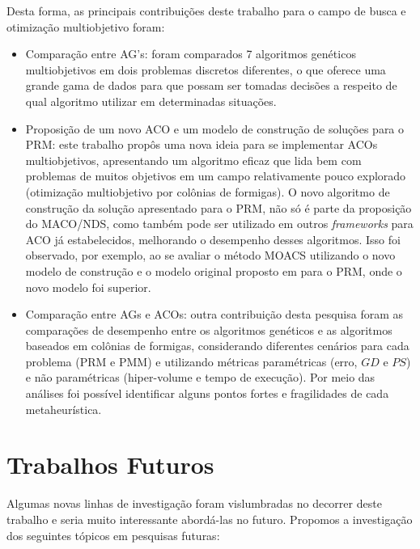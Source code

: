 Desta forma, as principais contribuições deste trabalho para o campo de busca e otimização multiobjetivo foram:

\begin{itemize}
	\item Comparação entre AG's: foram comparados 7 algoritmos genéticos multiobjetivos em dois problemas discretos diferentes, o que oferece uma grande gama de dados para que possam ser tomadas decisões a respeito de qual algoritmo utilizar em determinadas situações.
	\item Proposição de um novo ACO e um modelo de construção de soluções para o PRM: este trabalho propôs uma nova ideia para se implementar ACOs multiobjetivos, apresentando um algoritmo eficaz que lida bem com problemas de muitos objetivos em um campo relativamente pouco explorado (otimização multiobjetivo por colônias de formigas). O novo algoritmo de construção da solução apresentado para o PRM, não só é parte da proposição do MACO/NDS, como também pode ser utilizado em outros \textit{frameworks} para ACO já estabelecidos, melhorando o desempenho desses algoritmos. Isso foi observado, por exemplo, ao se avaliar o método MOACS utilizando o novo modelo de construção e o modelo original proposto em \cite{Riveros2016} para o PRM, onde o novo modelo foi superior.
	\item Comparação entre AGs e ACOs: outra contribuição desta pesquisa foram as comparações de desempenho entre os algoritmos genéticos e as algoritmos baseados em colônias de formigas, considerando diferentes cenários para cada problema (PRM e PMM) e utilizando  métricas paramétricas (erro, $GD$ e $PS$) e não paramétricas (hiper-volume e tempo de execução). Por meio das análises foi possível identificar alguns pontos fortes e fragilidades de cada metaheurística.
\end{itemize}

\section{Trabalhos Futuros}
Algumas novas linhas de investigação foram vislumbradas no decorrer deste trabalho e seria muito interessante abordá-las no futuro. Propomos a investigação dos seguintes tópicos em pesquisas futuras:

